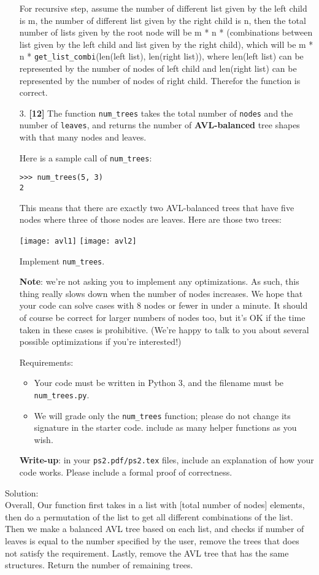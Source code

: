 \documentclass{assignment-263}
\begin{document}
\begin{enumerate}
For recursive step, assume the number of different list given by the left child is m, the number of different list given by the right child is n, then the total number of lists given by the root node will be m * n * (combinations between list given by the left child and list given by the right child), which will be m * n * \verb|get_list_combi|(len(left list), len(right list)), where len(left list) can be represented by the number of nodes of left child and len(right list) can be represented by the number of nodes of right child.
Therefor the function is correct.\\

\item[3.] \textbf{[12]} 
The function \verb|num_trees| takes the total number of \verb|nodes| and the number of \verb|leaves|, and returns the number of {\bf AVL-balanced} tree shapes with that many nodes and leaves.

Here is a sample call of \verb|num_trees|:
\begin{verbatim}
>>> num_trees(5, 3)
2
\end{verbatim}

This means that there are exactly two AVL-balanced trees that have five nodes where three of those nodes are leaves. Here are those two trees:

\texttt{[image: avl1]}
\texttt{[image: avl2]}

Implement \verb|num_trees|.

{\bf Note}: we're not asking you to implement any optimizations. As such, this thing really slows down when the number of nodes increases. We hope that your code can solve cases with 8 nodes or fewer in under a minute. It should of course be correct for larger numbers of nodes too, but it's OK if the time taken in these cases is prohibitive. (We're happy to talk to you about several possible optimizations if you're interested!)

Requirements:
\begin{itemize}
\item Your code must be written in Python 3, and the filename must be \verb|num_trees.py|.
\item We will grade only the \verb|num_trees| function; please do not change its signature in the starter code. include as many helper functions as you wish.
   \end{itemize}

\textbf{Write-up}: in your \verb|ps2.pdf/ps2.tex| files, include an explanation of how your code works. 
Please include a formal proof of correctness.
\end{enumerate}
Solution:\\
Overall, Our function first takes in a list with [total number of nodes] elements, then do a permutation of the list to get all different combinations of the list. Then we make a balanced AVL tree based on each list, and checks if number of leaves is equal to the number specified by the user, remove the trees that does not satisfy the requirement. Lastly, remove the AVL tree that has the same structures. Return the number of remaining trees.
\end{document}
